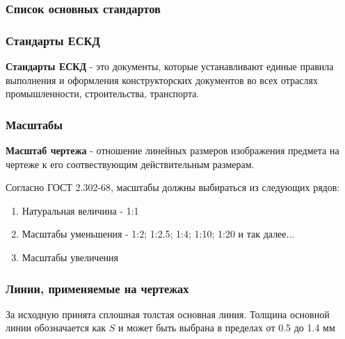 \documentclass{article}
\begin{document}
\subsubsection{Список основных стандартов}

\begin{flushleft}

\begin{multienumerate}
\end{multienumerate}

\subsubsection{Стандарты ЕСКД}

\textbf{Стандарты ЕСКД} - это документы, которые устанавливают единые правила выполнения и оформления конструкторских документов во всех отраслях промышленности, строительства, транспорта.

\subsubsection{Масштабы}

\textbf{Масштаб чертежа} - отношение линейных размеров изображения предмета на чертеже к его соотвествующим действительным размерам.

Согласно ГОСТ 2.302-68, масштабы должны выбираться из следующих рядов:

\begin{enumerate}
    \item Натуральная величина - 1:1
    \item Масштабы уменьшения - 1:2; 1:2.5; 1:4; 1:10; 1:20 и так далее...
    \item Масштабы увеличения
\end{enumerate}

\end{flushleft}

\subsubsection{Линии, применяемые на чертежах}

За исходную принята сплошная толстая основная линия. Толщина основной линии обозначается как $S$ и может быть выбрана в пределах от 0.5 до 1.4 мм
\end{document}
